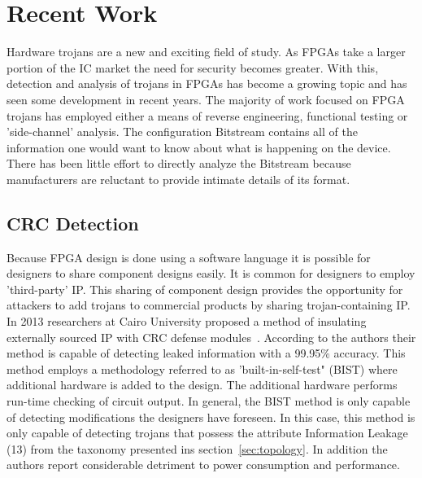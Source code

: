 \section{Recent Work}
Hardware trojans are a new and exciting field of study.
As \acrshort{FPGA}s take a larger portion of the \acrfull{IC} market the need for security becomes greater.
With this, detection and analysis of trojans in \acrshort{FPGA}s has become a growing topic and has seen some development in recent years.
The majority of work focused on \acrshort{FPGA} trojans has employed either a means of reverse engineering, functional testing or 'side-channel' analysis.
The configuration \gls{Bitstream} contains all of the information one would want to know about what is happening on the device.
There has been little effort to directly analyze the \gls{Bitstream} because manufacturers are reluctant to provide intimate details of its format.
  
\subsection{\acrfull{CRC} Detection} \label{sec:crcDetection}
Because \acrshort{FPGA} design is done using a software language it is possible for designers to share component designs easily.
It is common for designers to employ 'third-party' \acrfull{IP}. 
This sharing of component design provides the opportunity for attackers to add trojans to commercial products by sharing trojan-containing \acrshort{IP}.
In 2013 researchers at Cairo University proposed a method of insulating externally sourced \acrshort{IP} with \acrfull{CRC} defense modules~\cite{crcDetection}.
According to the authors their method is capable of detecting leaked information with a 99.95\% accuracy.
This method employs a methodology referred to as 'built-in-self-test" (BIST) where additional hardware is added to the design.
The additional hardware performs run-time checking of circuit output.
In general, the BIST method is only capable of detecting modifications the designers have foreseen.
In this case, this method is only capable of detecting trojans that possess the attribute Information Leakage (13) from the taxonomy presented ins section~\ref{sec:topology}.
In addition the authors report considerable detriment to power consumption and performance.


